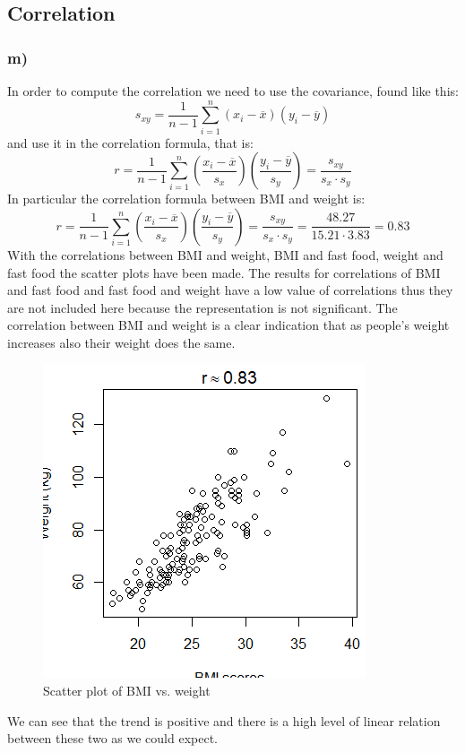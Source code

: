 \subsection{Correlation}

\subsubsection{m)}
In order to compute the correlation we need to use the covariance, found like this:
\[ s_{xy} = \frac{1}{n-1} \sum_{i=1}^{n} (x_i-\overline{x})(y_i-\overline{y}) \]
and use it in the correlation formula, that is:
\[ r=\frac{1}{n-1}\sum_{i=1}^{n} \left( \frac{x_i-\overline{x}}{s_x} \right) \left( \frac{y_i-\overline{y}}{s_y} \right)=\frac{s_{xy}}{s_x \cdot s_y}\]
In particular the correlation formula between BMI and weight is:
\[ r=\frac{1}{n-1}\sum_{i=1}^{n} \left( \frac{x_i-\overline{x}}{s_x} \right) \left( \frac{y_i-\overline{y}}{s_y} \right)=\frac{s_{xy}}{s_x \cdot s_y}=\frac{48.27}{15.21 \cdot 3.83}=0.83 \]
With the correlations between BMI and weight, BMI and fast food, weight and fast food the scatter plots have been made. The results for correlations of BMI and fast food and fast food and weight have a low value of correlations thus they are not included here because the representation is not significant. The correlation between BMI and weight is a clear indication that as people's weight increases also their weight does the same.
\begin{figure}[h]
    \centering
    \includegraphics[scale=1]{root/Scatter.png}
    \caption{Scatter plot of BMI vs. weight}
    \label{scatter}
\end{figure}
We can see that the trend is positive and there is a high level of linear relation between these two as we could expect.
